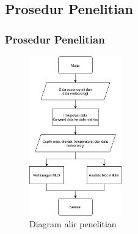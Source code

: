 \documentclass{beamer}
\begin{document}
\subsection{Prosedur Penelitian}
\begin{frame}
	\frametitle{Prosedur Penelitian}
	\begin{figure}[H]
		\centering
		\includegraphics[width=4cm]{flowchart.png}
		\caption{Diagram alir penelitian}
		\label{fig:flowchart}
	\end{figure}
\end{frame}
\end{document}
